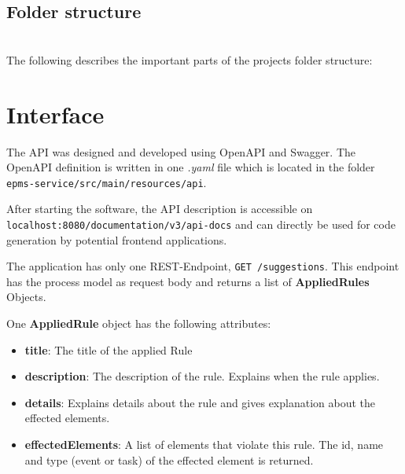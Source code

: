\subsection{Folder structure}~\\
The following describes the important parts of the projects folder structure:

\section{Interface}
The API was designed and developed using OpenAPI and Swagger\cite{swagger}. The OpenAPI definition is written in one \textit{.yaml} file which is located in the folder\\ \verb|epms-service/src/main/resources/api|.

After starting the software, the API description is accessible on \\ \verb|localhost:8080/documentation/v3/api-docs| and can directly be used for code generation by potential frontend applications. 

The application has only one REST-Endpoint, \verb|GET /suggestions|. This endpoint has the process model as request body and returns a list of \textbf{AppliedRules} Objects. 

One \textbf{AppliedRule} object has the following attributes:
\begin{itemize}
	\item \textbf{title}: The title of the applied Rule
	\item \textbf{description}: The description of the rule. Explains when the rule applies.
	\item \textbf{details}: Explains details about the rule and gives explanation about the effected elements.
	\item \textbf{effectedElements}: A list of elements that violate this rule. The id, name and type (event or task) of the effected element is returned.
\end{itemize} 
